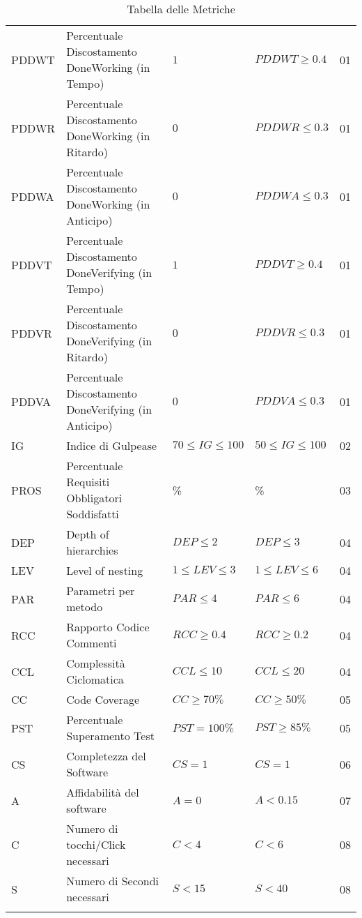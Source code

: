 \begin{longtable}{
		>{\centering}p{}
		>{}p{}
		>{\centering}p{}
		>{\centering}p{}
		>{}p{} }
	PDDWT & Percentuale Discostamento DoneWorking (in Tempo) & $1$ & $PDDWT \geq 0.4$ & 01 \\
	
	PDDWR & Percentuale Discostamento DoneWorking (in Ritardo) & $0$ & $PDDWR \leq 0.3$ & 01 \\
	
	PDDWA & Percentuale Discostamento DoneWorking (in Anticipo) & $0$ & $PDDWA \leq 0.3$ & 01 \\
	
	PDDVT & Percentuale Discostamento DoneVerifying (in Tempo) & $1$ & $PDDVT \geq 0.4$ & 01 \\
	
	PDDVR & Percentuale Discostamento DoneVerifying (in Ritardo) & $0$ & $PDDVR \leq 0.3$ & 01 \\
	
	PDDVA & Percentuale Discostamento DoneVerifying (in Anticipo) & $0$ & $PDDVA \leq 0.3$ & 01 \\
	
	IG & Indice di Gulpease & $70 \leq IG \leq 100$ & $50 \leq IG \leq 100$ & 02 \\
	
	PROS & Percentuale Requisiti Obbligatori Soddisfatti & 100\% & 100\% & 03 \\
	
	DEP & Depth of hierarchies & $DEP \leq 2$ & $DEP \leq 3$ & 04 \\
	
	LEV & Level of nesting & $1\leq LEV \leq 3$ & $1\leq LEV \leq 6$ & 04 \\
	
	PAR & Parametri per metodo & $PAR \leq 4$ & $PAR \leq 6$ & 04 \\
	
	RCC & Rapporto Codice Commenti & $RCC \geq 0.4$ & $RCC \geq 0.2$  & 04 \\
	
	CCL & Complessità Ciclomatica & $CCL \leq 10 $ & $CCL \leq 20 $& 04 \\
	
	CC & Code Coverage & $CC\geq 70\%$ & $CC\geq 50\%$ & 05 \\
	
	PST & Percentuale Superamento Test & $PST=100\%$ & $PST\geq85\%$ & 05 \\
	
	CS & Completezza del Software & $CS=1$ & $CS=1$ & 06 \\
	
	A & Affidabilità del software & $A=0$ & $A < 0.15$ & 07 \\
	
	C & Numero di tocchi/Click necessari & $C<4$ & $C<6$& 08 \\
	
	S & Numero di Secondi necessari & $S<15$ & $S<40$ & 08 \\
	
	
	\caption{Tabella delle Metriche}
\end{longtable}



